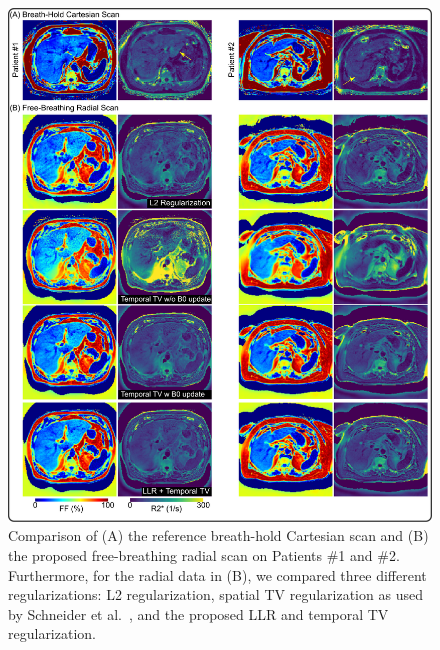 \documentclass[journal,twoside,web]{ieeecolor}
\begin{document}
\begin{figure}
	\centering
	\includegraphics[width=\textwidth]{../../figures/tan5.pdf}
	\caption{Comparison of (A) the reference breath-hold Cartesian scan and 
		(B) the proposed free-breathing radial scan on Patients \#1 and \#2. 
		Furthermore, for the radial data in (B), 
		we compared three different regularizations: 
		L2 regularization, 
		spatial TV regularization as used by Schneider et al.~\cite{schneider_2020_mobawfr2s}, 
		and the proposed LLR and temporal TV regularization. }
	\label{FIG:REGU}
\end{figure}
\end{document}
